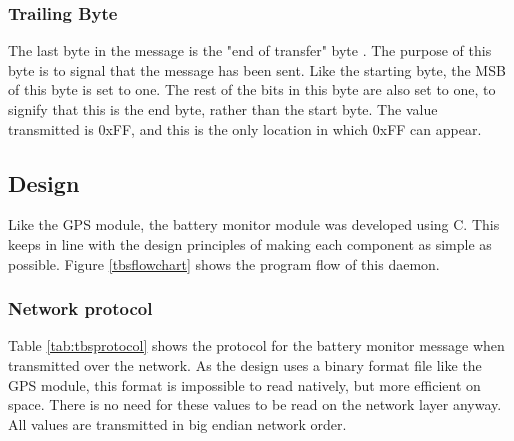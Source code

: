 
\subsubsection{Trailing Byte}

The last byte in the message is the "end of transfer" byte \cite{e_xpert}. The purpose of this byte is to signal that the message has been sent. Like the starting byte, the MSB of this byte is set to one. The rest of the bits in this byte are also set to one, to signify that this is the end byte, rather than the start byte. The value transmitted is 0xFF, and this is the only location in which 0xFF can appear.


\subsection {Design}

Like the GPS module, the battery monitor module was developed using C. This keeps in line with the design principles of making each component as simple as possible. Figure \ref{tbsflowchart} shows the program flow of this daemon.


\subsubsection{Network protocol}

Table \ref{tab:tbsprotocol} shows the protocol for the battery monitor message when transmitted over the network. As the design uses a binary format file like the GPS module, this format is impossible to read natively, but more efficient on space. There is no need for these values to be read on the network layer anyway. All values are transmitted in big endian network order.

